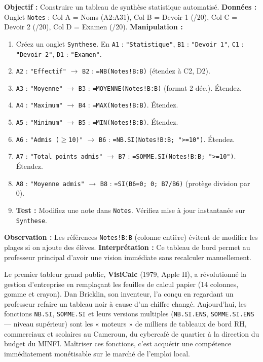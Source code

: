 \documentclass[11pt]{article}
\begin{document}
\begin{experience}
\textbf{Objectif :} Construire un tableau de synthèse statistique automatisé.
\textbf{Données :} Onglet \texttt{Notes} : Col A = Noms (A2:A31), Col B = Devoir 1 (/20), Col C = Devoir 2 (/20), Col D = Examen (/20).
\textbf{Manipulation :}
\begin{enumerate}
    \item Créez un onglet \texttt{Synthese}. En \texttt{A1} : \texttt{"Statistique"}, \texttt{B1} : \texttt{"Devoir 1"}, \texttt{C1} : \texttt{"Devoir 2"}, \texttt{D1} : \texttt{"Examen"}.
    \item \texttt{A2} : \texttt{"Effectif"} $\rightarrow$ \texttt{B2} : \texttt{=NB(Notes!B:B)} (étendez à C2, D2).
    \item \texttt{A3} : \texttt{"Moyenne"} $\rightarrow$ \texttt{B3} : \texttt{=MOYENNE(Notes!B:B)} (format 2 déc.). Étendez.
    \item \texttt{A4} : \texttt{"Maximum"} $\rightarrow$ \texttt{B4} : \texttt{=MAX(Notes!B:B)}. Étendez.
    \item \texttt{A5} : \texttt{"Minimum"} $\rightarrow$ \texttt{B5} : \texttt{=MIN(Notes!B:B)}. Étendez.
    \item \texttt{A6} : \texttt{"Admis ($\ge$10)"} $\rightarrow$ \texttt{B6} : \texttt{=NB.SI(Notes!B:B; ">=10")}. Étendez.
    \item \texttt{A7} : \texttt{"Total points admis"} $\rightarrow$ \texttt{B7} : \texttt{=SOMME.SI(Notes!B:B; ">=10")}. Étendez.
    \item \texttt{A8} : \texttt{"Moyenne admis"} $\rightarrow$ \texttt{B8} : \texttt{=SI(B6=0; 0; B7/B6)} (protège division par 0).
    \item \textbf{Test :} Modifiez une note dans \texttt{Notes}. Vérifiez mise à jour instantanée sur \texttt{Synthese}.
\end{enumerate}
\textbf{Observation :} Les références \texttt{Notes!B:B} (colonne entière) évitent de modifier les plages si on ajoute des élèves.
\textbf{Interprétation :} Ce tableau de bord permet au professeur principal d'avoir une vision immédiate sans recalculer manuellement.
\end{experience}

\begin{savaistu}
Le premier tableur grand public, \textbf{VisiCalc} (1979, Apple II), a révolutionné la gestion d'entreprise en remplaçant les feuilles de calcul papier (14 colonnes, gomme et crayon). Dan Bricklin, son inventeur, l'a conçu en regardant un professeur refaire un tableau noir à cause d'un chiffre changé. Aujourd'hui, les fonctions \texttt{NB.SI}, \texttt{SOMME.SI} et leurs versions multiples (\texttt{NB.SI.ENS}, \texttt{SOMME.SI.ENS} — niveau supérieur) sont les « moteurs » de milliers de tableaux de bord RH, commerciaux et scolaires au Cameroun, du cybercafé de quartier à la direction du budget du MINFI. Maîtriser ces fonctions, c'est acquérir une compétence immédiatement monétisable sur le marché de l'emploi local.
\end{savaistu}
\end{document}
